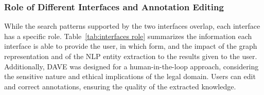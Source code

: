 
\subsubsection{Role of Different Interfaces and Annotation Editing}

While the search patterns supported by the two interfaces overlap, each interface has a specific role. 
Table~\ref{tab:interfaces role} summarizes the information each interface is able to provide the user, in which form, and the impact of the graph representation and of the NLP entity extraction to the results given to the user.
Additionally, DAVE was designed for a human-in-the-loop approach, considering the sensitive nature and ethical implications of the legal domain. Users can edit and correct annotations, ensuring the quality of the extracted knowledge.




